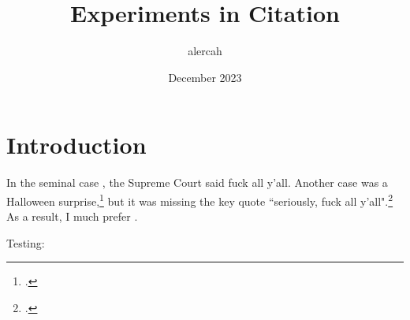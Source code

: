 \documentclass{article}
\title{Experiments in Citation}
\author{alercah}
\date{December 2023}
\begin{document}
\maketitle

\section{Introduction}

In the seminal case \textcite{oakes}, the Supreme Court said fuck all y'all. Another case was a Halloween surprise,\footcite{sauvé} but it was missing the key quote ``seriously, fuck all y'all".\footcite{oakes} As a result, I much prefer \textcite{oakes}.

Testing: \cite{oakes} \cite{oakes}

\printbibliography[filter=mcgill]
\end{document}
